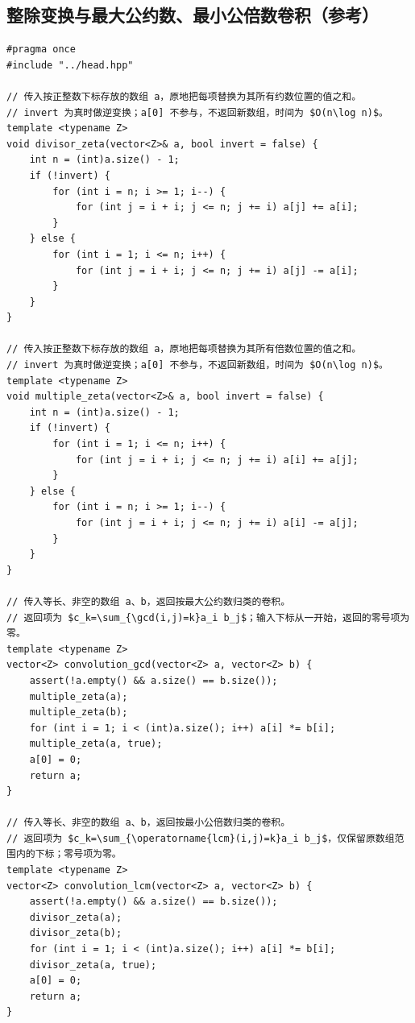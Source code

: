 \subsection{整除变换与最大公约数、最小公倍数卷积（参考）}
\par

\begin{lstlisting}
#pragma once
#include "../head.hpp"

// 传入按正整数下标存放的数组 a，原地把每项替换为其所有约数位置的值之和。
// invert 为真时做逆变换；a[0] 不参与，不返回新数组，时间为 $O(n\log n)$。
template <typename Z>
void divisor_zeta(vector<Z>& a, bool invert = false) {
    int n = (int)a.size() - 1;
    if (!invert) {
        for (int i = n; i >= 1; i--) {
            for (int j = i + i; j <= n; j += i) a[j] += a[i];
        }
    } else {
        for (int i = 1; i <= n; i++) {
            for (int j = i + i; j <= n; j += i) a[j] -= a[i];
        }
    }
}

// 传入按正整数下标存放的数组 a，原地把每项替换为其所有倍数位置的值之和。
// invert 为真时做逆变换；a[0] 不参与，不返回新数组，时间为 $O(n\log n)$。
template <typename Z>
void multiple_zeta(vector<Z>& a, bool invert = false) {
    int n = (int)a.size() - 1;
    if (!invert) {
        for (int i = 1; i <= n; i++) {
            for (int j = i + i; j <= n; j += i) a[i] += a[j];
        }
    } else {
        for (int i = n; i >= 1; i--) {
            for (int j = i + i; j <= n; j += i) a[i] -= a[j];
        }
    }
}

// 传入等长、非空的数组 a、b，返回按最大公约数归类的卷积。
// 返回项为 $c_k=\sum_{\gcd(i,j)=k}a_i b_j$；输入下标从一开始，返回的零号项为零。
template <typename Z>
vector<Z> convolution_gcd(vector<Z> a, vector<Z> b) {
    assert(!a.empty() && a.size() == b.size());
    multiple_zeta(a);
    multiple_zeta(b);
    for (int i = 1; i < (int)a.size(); i++) a[i] *= b[i];
    multiple_zeta(a, true);
    a[0] = 0;
    return a;
}

// 传入等长、非空的数组 a、b，返回按最小公倍数归类的卷积。
// 返回项为 $c_k=\sum_{\operatorname{lcm}(i,j)=k}a_i b_j$，仅保留原数组范围内的下标；零号项为零。
template <typename Z>
vector<Z> convolution_lcm(vector<Z> a, vector<Z> b) {
    assert(!a.empty() && a.size() == b.size());
    divisor_zeta(a);
    divisor_zeta(b);
    for (int i = 1; i < (int)a.size(); i++) a[i] *= b[i];
    divisor_zeta(a, true);
    a[0] = 0;
    return a;
}
\end{lstlisting}

